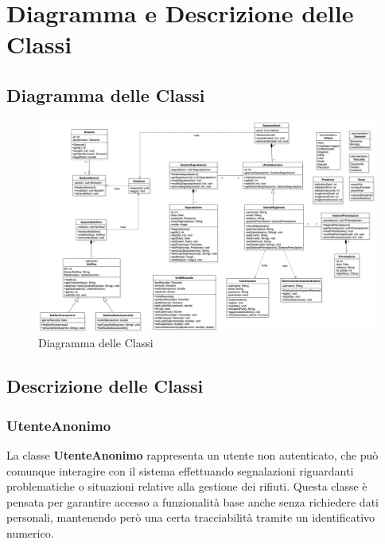\section{Diagramma e Descrizione delle Classi}

\subsection{Diagramma delle Classi}
\begin{figure}[H]
    \centering
    \includegraphics[width=1.05\linewidth]{D2-G1//Img/ClassDiagram.png}
    \caption{Diagramma delle Classi}
    \label{fig:enter-label}
\end{figure}

\subsection{Descrizione delle Classi}

\subsubsection{UtenteAnonimo}

La classe \textbf{UtenteAnonimo} rappresenta un utente non autenticato, che può comunque interagire con il sistema effettuando segnalazioni riguardanti problematiche o situazioni relative alla gestione dei rifiuti. Questa classe è pensata per garantire accesso a funzionalità base anche senza richiedere dati personali, mantenendo però una certa tracciabilità tramite un identificativo numerico.

